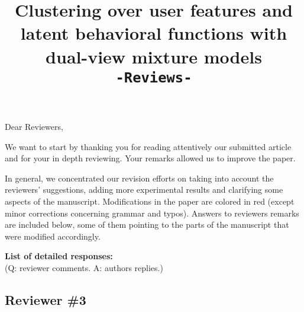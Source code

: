 \documentclass[]{article}
\title{Clustering over user features and latent behavioral functions with dual-view mixture models \\ \texttt{-Reviews-}}
\author{}
\begin{document}
	\date{}
	\maketitle
	
	Dear Reviewers,
	
	We want to start by thanking you for reading attentively our submitted article and for your in depth reviewing. Your remarks  allowed us to improve the paper.
	
	In general, we concentrated our revision efforts on taking into account the reviewers' suggestions, adding more experimental results and clarifying some aspects of the manuscript. Modifications in the paper are colored in red (except minor corrections concerning grammar and typos). Answers to reviewers remarks are included below, some of them pointing to the parts of the manuscript that were modified accordingly.
	
	\bigskip
	\noindent
	\textbf{List of detailed responses:}\\
	(Q: reviewer comments.
	A: authors replies.)
	\subsection*{Reviewer \#3}
	
\end{document}
